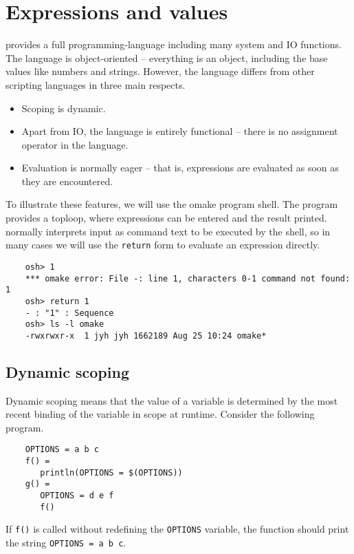 %
%
\section{Expressions and values}

 provides a full programming-language including many
system and IO functions.  The language is object-oriented -- everything is
an object, including the base values like numbers and strings.  However,
the  language differs from other scripting languages in
three main respects.

\begin{itemize}
\item Scoping is dynamic.
\item Apart from IO, the language is entirely functional -- there is no
  assignment operator in the language.
\item Evaluation is normally eager -- that is, expressions are evaluated as soon
  as they are encountered.
\end{itemize}

To illustrate these features, we will use the  omake program shell.
The  program provides a toploop, where expressions can be entered
and the result printed.   normally interprets input as command text
to be executed by the shell, so in many cases we will use the \verb+return+
form to evaluate an expression directly.

\begin{verbatim}
    osh> 1
    *** omake error: File -: line 1, characters 0-1 command not found: 1
    osh> return 1
    - : "1" : Sequence
    osh> ls -l omake
    -rwxrwxr-x  1 jyh jyh 1662189 Aug 25 10:24 omake*
\end{verbatim}

\subsection{Dynamic scoping}

Dynamic scoping means that the value of a variable is determined by the most
recent binding of the variable in scope at runtime.  Consider the following
program.

\begin{verbatim}
    OPTIONS = a b c
    f() =
       println(OPTIONS = $(OPTIONS))
    g() =
       OPTIONS = d e f
       f()
\end{verbatim}

If \verb+f()+ is called without redefining the \verb+OPTIONS+ variable,
the function should print the string \verb+OPTIONS = a b c+.

